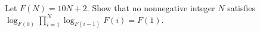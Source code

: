 Let $F(N)=10N+2$. Show that no nonnegative integer $N$ satisfies $\log_{F(0)}\displaystyle\prod_{i=1}^{N}\log_{F(i-1)}F(i)=F(1)$.
